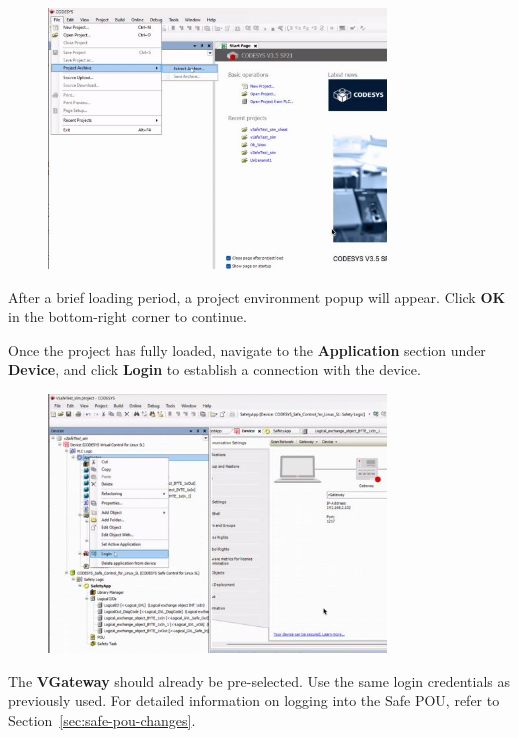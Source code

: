 \documentclass[a4paper,12pt]{article}
\begin{document}
\begin{figure}[H]
	\centering
	\includegraphics[width=0.8\textwidth]{c1.JPG}
\end{figure}

After a brief loading period, a project environment popup will appear. Click \textbf{OK} in the bottom-right corner to continue.

Once the project has fully loaded, navigate to the \textbf{Application} section under \textbf{Device}, and click \textbf{Login} to establish a connection with the device.

\begin{figure}[H]
	\centering
	\includegraphics[width=0.8\textwidth]{c2.JPG}
\end{figure}

The \textbf{VGateway} should already be pre-selected. Use the same login credentials as previously used. For detailed information on logging into the Safe POU, refer to Section~\ref{sec:safe-pou-changes}.
\end{document}
